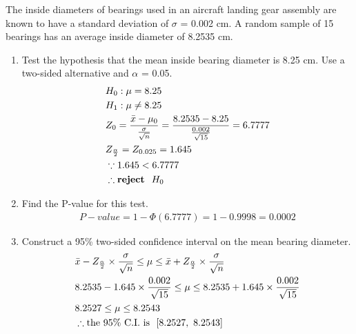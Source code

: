 The inside diameters of bearings used in an aircraft landing gear assembly are known to have a standard deviation of $\sigma$ = 0.002 cm. A random sample of 15 bearings has an average inside diameter of 8.2535 cm.

\begin{enumerate}
    \item Test the hypothesis that the mean inside bearing diameter is 8.25 cm. Use a two-sided alternative and $\alpha$ = 0.05.
        \begin{align*}
            &H_0: \mu = 8.25 \\
            &H_1: \mu \neq 8.25 \\
            &Z_0 = \frac{\Bar{x} - \mu_0}{\frac{\sigma}{\sqrt{n}}} = \frac{8.2535 - 8.25}{\frac{0.002}{\sqrt{15}}} = 6.7777 \\
            &Z_\frac{\alpha}{2} = Z_{0.025} = 1.645 \\
            &\because 1.645 < 6.7777\\
            &\therefore \textbf{reject } \ H_0 \\
        \end{align*}

    \item Find the P-value for this test.
        \begin{align*}
            P-value = 1 - \Phi(6.7777) 
            = 1 - 0.9998
            = 0.0002
        \end{align*}

    \item Construct a 95\% two-sided confidence interval on the mean bearing diameter.
        \begin{align*}
            &\Bar{x} - Z_\frac{\alpha}{2} \times \frac{\sigma}{\sqrt{n}} \leq \mu \leq \Bar{x} + Z_\frac{\alpha}{2} \times \frac{\sigma}{\sqrt{n}}\\
            &8.2535 - 1.645 \times \frac{0.002}{\sqrt{15}} \leq \mu \leq 8.2535 + 1.645 \times \frac{0.002}{\sqrt{15}} \\
            &8.2527 \leq \mu \leq 8.2543\\
            &\therefore \text{the 95\% C.I. is } \ [8.2527, \ 8.2543]\\
        \end{align*}
    
\end{enumerate}
